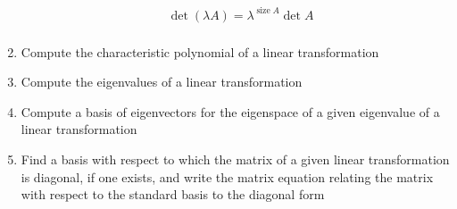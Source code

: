 \documentclass[10pt]{article}
\begin{document}
\begin{enumerate}
{\begin{align*}
&\operatorname{det}(\lambda A)=\lambda^{\operatorname{size}A}\operatorname{det}A\\
\end{align*}}
\item{Compute the characteristic polynomial of a linear transformation}
\item{Compute the eigenvalues of a linear transformation}
\item{Compute a basis of eigenvectors for the eigenspace of a given eigenvalue of a linear transformation}
\item{Find a basis with respect to which the matrix of a given linear transformation is diagonal, if one exists, and write the matrix equation relating the matrix with respect to the standard basis to the diagonal form}
\end{enumerate}
\end{document}
